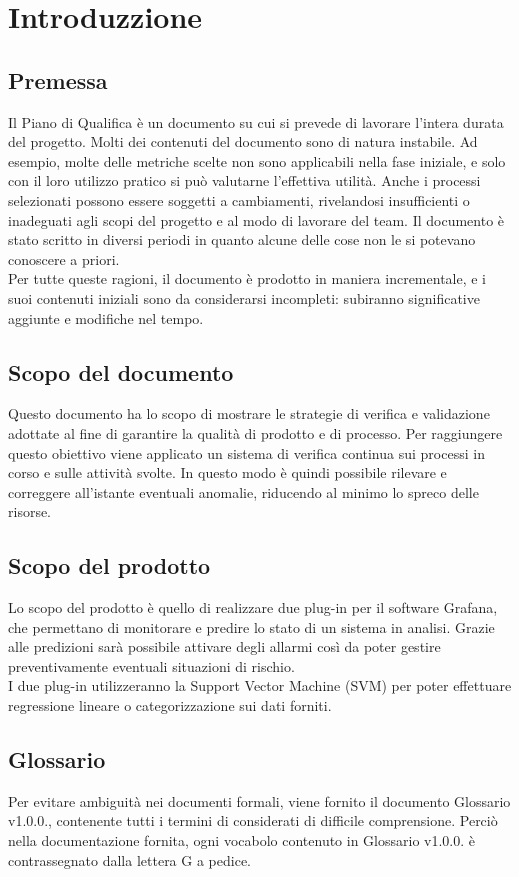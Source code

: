 \section{Introduzzione}
\subsection{Premessa}
Il Piano di Qualifica è un documento su cui si prevede di lavorare l'intera durata del progetto. Molti dei contenuti del documento sono di natura instabile. Ad esempio, molte delle metriche scelte non sono applicabili nella fase iniziale, e solo con il loro utilizzo pratico si può valutarne l'effettiva utilità. Anche i processi selezionati possono essere soggetti a cambiamenti, rivelandosi insufficienti o inadeguati agli scopi del progetto e al modo di lavorare del team. Il documento è stato scritto in diversi periodi in quanto alcune delle cose non le si potevano conoscere a priori. \\
Per tutte queste ragioni, il documento è prodotto in maniera incrementale, e i suoi contenuti iniziali sono da considerarsi incompleti: subiranno significative aggiunte e modifiche nel tempo.

\subsection{Scopo del documento}
Questo documento ha lo scopo di mostrare le strategie di verifica e validazione adottate al fine di garantire la qualità di prodotto e di processo. Per raggiungere questo obiettivo viene applicato un sistema di verifica continua sui processi in corso e sulle attività svolte. In questo modo è quindi possibile rilevare e correggere all'istante eventuali anomalie, riducendo al minimo lo spreco delle risorse.

\subsection{Scopo del prodotto}
Lo scopo del prodotto è quello di realizzare due plug-in per il software Grafana, che permettano di monitorare e predire lo stato di un sistema in analisi. Grazie alle predizioni sarà possibile attivare degli allarmi così da poter gestire preventivamente eventuali situazioni di rischio. \\
I due plug-in utilizzeranno la Support Vector Machine (SVM) per poter effettuare regressione lineare o categorizzazione sui dati forniti.

\subsection{Glossario}
Per evitare ambiguità nei documenti formali, viene fornito il documento Glossario v1.0.0.,
contenente tutti i termini di considerati di difficile comprensione. Perciò nella documentazione
fornita, ogni vocabolo contenuto in Glossario v1.0.0. è contrassegnato dalla lettera G a
pedice.

